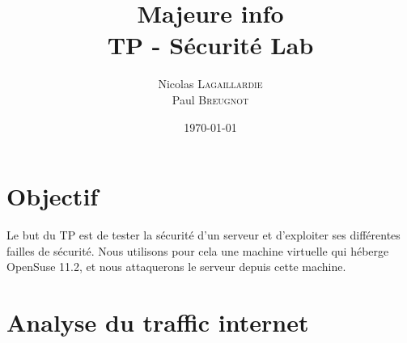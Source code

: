 \documentclass{article}
\title{Majeure info \\ TP - S\'{e}curit\'{e} Lab} %
\author{Nicolas \textsc{Lagaillardie} \\ Paul \textsc{Breugnot}} %
\date{\today} %
\begin{document}
\maketitle %

\tableofcontents
\newpage




\section{Objectif}

Le but du TP est de tester la s\'{e}curit\'{e} d'un serveur et d'exploiter ses diff\'{e}rentes failles de s\'{e}curit\'{e}. Nous utilisons pour cela une machine virtuelle qui h\'{e}berge OpenSuse 11.2, et nous attaquerons le serveur depuis cette machine.
 

\section{Analyse du traffic internet}
\end{document}
